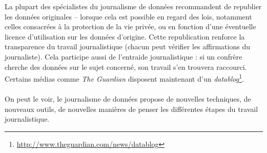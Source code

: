 La plupart des spécialistes du journalisme de données recommandent de republier les
données originales \cite{handbook, bradshaw} -- lorsque cela est possible en regard des lois, notamment celles 
consacrées à la protection de la vie privée, ou en fonction d'une éventuelle licence
d'utilisation sur les données d'origine. Cette republication renforce la transparence
du travail journalistique (chacun peut vérifier les affirmations du journaliste).
Cela participe aussi de l'entraide journalistique : si un confrère cherche des données
sur le sujet concerné, son travail s'en trouvera raccourci. Certains médias comme \textit{The Guardian} disposent maintenant d'un \textit{datablog}\footnote{\url{http://www.theguardian.com/news/datablog}}. \\\\

On peut le voir, le journalisme de données propose de nouvelles techniques, de nouveaux outils, de nouvelles manières de penser les différentes étapes du travail journalistique.


